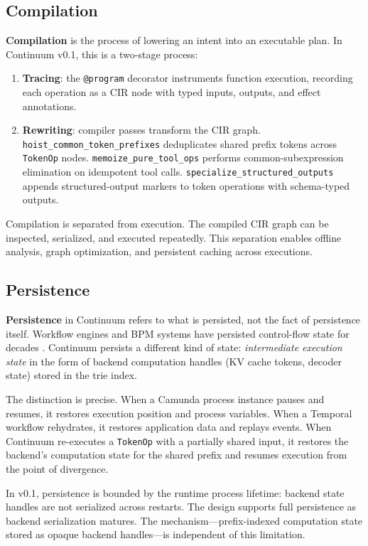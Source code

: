 \documentclass[10pt,twocolumn]{article}
\begin{document}
\subsection{Compilation}
\textbf{Compilation} is the process of lowering an intent into an executable plan. In Continuum v0.1, this is a two-stage process:
\begin{enumerate}[leftmargin=*]
  \item \textbf{Tracing}: the \texttt{@program} decorator instruments function execution, recording each operation as a CIR node with typed inputs, outputs, and effect annotations.
  \item \textbf{Rewriting}: compiler passes transform the CIR graph. \texttt{hoist\_common\_token\_prefixes} deduplicates shared prefix tokens across \texttt{TokenOp} nodes. \texttt{memoize\_pure\_tool\_ops} performs common-subexpression elimination on idempotent tool calls. \texttt{specialize\_structured\_outputs} appends structured-output markers to token operations with schema-typed outputs.
\end{enumerate}

Compilation is separated from execution. The compiled CIR graph can be inspected, serialized, and executed repeatedly. This separation enables offline analysis, graph optimization, and persistent caching across executions.

\subsection{Persistence}
\label{sec:persistence}
\textbf{Persistence} in Continuum refers to what is persisted, not the fact of persistence itself. Workflow engines and BPM systems have persisted control-flow state for decades \cite{havey2005essential,temporal2024docs}. Continuum persists a different kind of state: \emph{intermediate execution state} in the form of backend computation handles (KV cache tokens, decoder state) stored in the trie index.

The distinction is precise. When a Camunda \cite{camunda2024docs} process instance pauses and resumes, it restores execution position and process variables. When a Temporal \cite{temporal2024docs} workflow rehydrates, it restores application data and replays events. When Continuum re-executes a \texttt{TokenOp} with a partially shared input, it restores the backend's computation state for the shared prefix and resumes execution from the point of divergence.

In v0.1, persistence is bounded by the runtime process lifetime: backend state handles are not serialized across restarts. The design supports full persistence as backend serialization matures. The mechanism---prefix-indexed computation state stored as opaque backend handles---is independent of this limitation.
\end{document}

